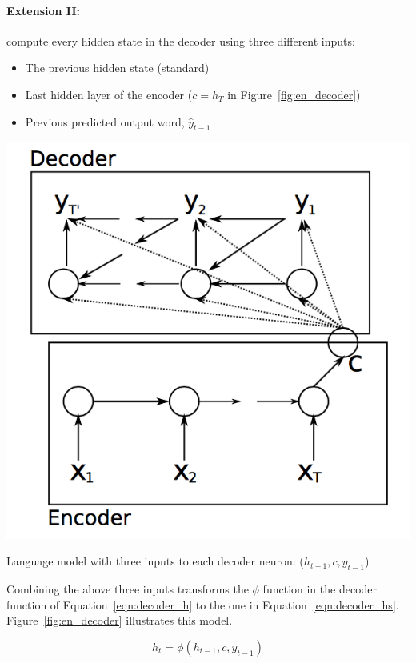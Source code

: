 \documentclass{tufte-handout}
\begin{document}
\paragraph{Extension II:} compute every hidden state in the decoder using three different inputs:

\begin{itemize}
	\item The previous hidden state (standard)
	\item  Last hidden layer of the encoder ($c = h_T$ in Figure~\ref{fig:en_decoder})
	\item Previous predicted output word, $\hat{y}_{t-1}$
\end{itemize}

\begin{marginfigure}
	\centering
	\includegraphics[width=\linewidth]{en_decoder.png}
	\caption {Language model with three inputs to each decoder neuron: ($h_{t-1}, c, y_{t-1}$)}
	\label{fig:en_decoder}
\end{marginfigure}

Combining the above three inputs transforms the $\phi$ function in the decoder function of Equation~\ref{eqn:decoder_h} to the one in Equation~\ref{eqn:decoder_hs}. Figure~\ref{fig:en_decoder} illustrates this model.

\begin{equation}
	h_{t} = \phi (h_{t-1}, c, y_{t-1})
	\label{eqn:decoder_hs}
\end{equation}
\end{document}
